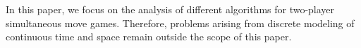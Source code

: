 In this paper, we focus on the analysis of different algorithms for two-player simultaneous move games. Therefore, 
problems arising from discrete modeling of continuous time and space remain outside the scope of this paper.






